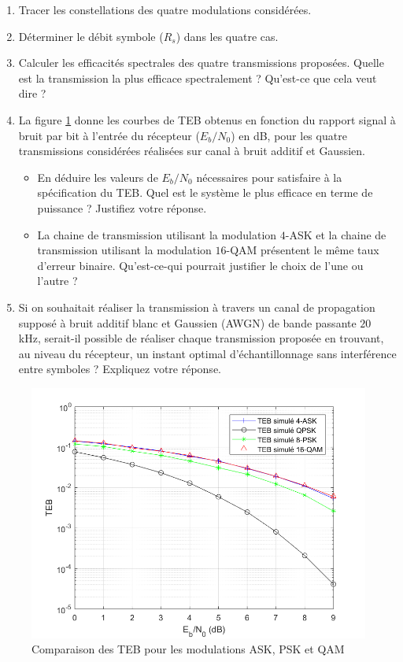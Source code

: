 \documentclass{article}
\begin{document}
\begin{enumerate}
    \item Tracer les constellations des quatre modulations considérées.
    \item Déterminer le débit symbole ($R_s$) dans les quatre cas.
    \item Calculer les efficacités spectrales des quatre transmissions proposées. Quelle est la transmission la plus efficace spectralement ? Qu'est-ce que cela veut dire ?
    \item La figure \ref{comp_TEB} donne les courbes de  TEB obtenus en fonction du rapport signal à bruit par bit à l'entrée du récepteur ($E_b/N_0$) en dB, pour les quatre transmissions considérées réalisées sur canal à bruit additif et Gaussien.
        \begin{itemize}
            \item En déduire les valeurs de $E_b/N_0$ nécessaires pour satisfaire à la spécification du TEB. Quel est le système le plus efficace en terme de puissance ? Justifiez votre réponse.
            \item La chaine de transmission utilisant la modulation $4$-ASK et la chaine de transmission utilisant la modulation $16$-QAM présentent le même taux d'erreur binaire. Qu'est-ce-qui pourrait justifier le choix de l'une ou l'autre ?
        \end{itemize}
    \item Si on souhaitait réaliser la transmission à travers un canal de propagation supposé à bruit additif blanc et Gaussien (AWGN) de bande passante $20$ kHz, serait-il possible de réaliser chaque transmission proposée en trouvant, au niveau du récepteur, un instant optimal d'échantillonnage sans interférence entre symboles ? Expliquez votre réponse.
\end{enumerate}

 \begin{figure}[ht!]
    \centering
    \includegraphics[width=12cm]{Comp_TEB.png}
    \caption{Comparaison des TEB pour les modulations ASK, PSK et QAM}
    \label{comp_TEB}
 \end{figure}
\end{document}
